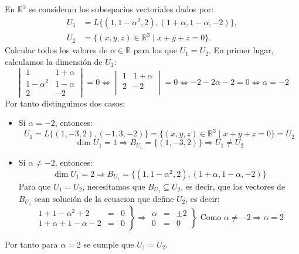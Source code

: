 \begin{ejercicio} En \( \mathbb{R}^3 \) se consideran los subespacios vectoriales dados por:
	\begin{align*}
		U_1 & = L\{ (1, 1 - \alpha^2, 2), (1 + \alpha, 1 - \alpha, -2) \}, \\
		U_2 & = \{ (x,y,z) \in \mathbb{R}^3 \mid x+y+z = 0 \}.
	\end{align*}
	Calcular todos los valores de \( \alpha \in \mathbb{R} \) para los que \( U_1 = U_2 \).
	En primer lugar, calculamos la dimensión de $U_1$:
	\begin{equation*}
		\begin{vmatrix}
			1          & 1+\alpha \\
			1-\alpha^2 & 1-\alpha \\
			2          & -2
		\end{vmatrix} = 0 \Leftrightarrow \begin{vmatrix}
			1 & 1+\alpha \\
			2 & -2       \\
		\end{vmatrix} = 0 \Leftrightarrow -2 -2\alpha -2 = 0 \Leftrightarrow \alpha = -2
	\end{equation*}
	Por tanto distinguimos dos casos:
	\begin{itemize}
		\item Si $\alpha = -2$, entonces:
		      \begin{equation*}
			      U_1 = L\{ (1, -3, 2), (-1, 3, -2) \} = \{ (x,y,z) \in \mathbb{R}^3 \mid x+y+z = 0 \} = U_2
		      \end{equation*}
		      \begin{equation*}
			      \dim{U_1} = 1 \Rightarrow B_{U_1} = \{(1,-3,2)\} \Rightarrow U_1 \neq U_2
		      \end{equation*}
		\item Si $\alpha \neq -2$, entonces:
		      \begin{equation*}
			      \dim{U_1} = 2 \Rightarrow B_{U_1} = \{(1, 1 - \alpha^2, 2), (1 + \alpha, 1 - \alpha, -2)\}
		      \end{equation*}
		      Para que $U_1 = U_2$, necesitamos que $B_{U_1} \subseteq U_2$, es decir, que los vectores de $B_{U_1}$ sean solución de la ecuacion que define $U_2$, es decir:
		      \begin{equation*}
			      \left.
			      \begin {array}{rcl}
			      1 + 1 - \alpha^2 + 2 & = & 0 \\
			      1 + \alpha + 1 - \alpha - 2 & = & 0
			      \end {array}
			      \right\} \Rightarrow \left.
			      \begin {array}{rcl}
			      \alpha & = & \pm 2 \\
			      0 & = & 0
			      \end {array}
			      \right\} \text{ Como } \alpha \neq -2 \Rightarrow \alpha = 2
		      \end{equation*}
	\end{itemize}
	Por tanto para $\alpha = 2$ se cumple que $U_1 = U_2$.
\end{ejercicio}



